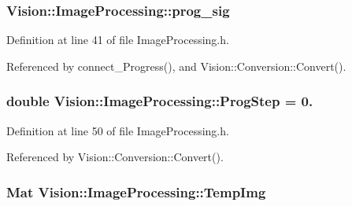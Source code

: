 \hypertarget{class_vision_1_1_image_processing_ac0c168e16365ff5941791f67ec895663}{}
\subsubsection[{prog\+\_\+sig}]{ Vision\+::\+Image\+Processing\+::prog\+\_\+sig\hspace{0.3cm}{\ttfamily [protected]}}\label{class_vision_1_1_image_processing_ac0c168e16365ff5941791f67ec895663}


Definition at line 41 of file Image\+Processing.\+h.



Referenced by connect\+\_\+\+Progress(), and Vision\+::\+Conversion\+::\+Convert().

\hypertarget{class_vision_1_1_image_processing_a7438451f9a447a33e9f04bf8e73eae31}{}
\subsubsection[{Prog\+Step}]{\setlength{\rightskip}{0pt plus 5cm}double Vision\+::\+Image\+Processing\+::\+Prog\+Step = 0.}\label{class_vision_1_1_image_processing_a7438451f9a447a33e9f04bf8e73eae31}


Definition at line 50 of file Image\+Processing.\+h.



Referenced by Vision\+::\+Conversion\+::\+Convert().

\hypertarget{class_vision_1_1_image_processing_a5371ad8d6f7aac9d43ee5c902ade7435}{}
\subsubsection[{Temp\+Img}]{\setlength{\rightskip}{0pt plus 5cm}Mat Vision\+::\+Image\+Processing\+::\+Temp\+Img\hspace{0.3cm}{\ttfamily [protected]}}\label{class_vision_1_1_image_processing_a5371ad8d6f7aac9d43ee5c902ade7435}


